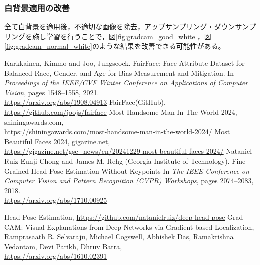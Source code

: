 \documentclass[a4paper,11pt,titlepage]{jsarticle}
\begin{document}
\subsubsection*{白背景適用の改善}
全て白背景を適用後，不適切な画像を除去，アップサンプリング・ダウンサンプリングを施し学習を行うことで，図\ref{fig:gradcam_good_white}，図\ref{fig:gradcam_normal_white}のような結果を改善できる可能性がある。




\begin{thebibliography}{9}
    Karkkainen, Kimmo and Joo, Jungseock.
    FairFace: Face Attribute Dataset for Balanced Race, Gender, and Age for Bias Measurement and Mitigation.
    In \textit{Proceedings of the IEEE/CVF Winter Conference on Applications of Computer Vision}, pages 1548--1558, 2021.\\
        \url{https://arxiv.org/abs/1908.04913}
      FairFace(GitHub), \url{https://github.com/joojs/fairface}
    Most Handsome Man In The World 2024, shiningawards.com, \\
    \url{https://shiningawards.com/most-handsome-man-in-the-world-2024/}
    Most Beautiful Faces 2024, gigazine.net, \\ \url{https://gigazine.net/gsc_news/en/20241229-most-beautiful-faces-2024/}
        Nataniel Ruiz Eunji Chong and James M. Rehg (Georgia Institute of Technology).
        Fine-Grained Head Pose Estimation Without Keypoints
         In \textit{The IEEE Conference on Computer Vision and Pattern Recognition (CVPR) Workshops}, pages 2074--2083, 2018. \\
          \url{https://arxiv.org/abs/1710.00925}

    Head Pose Estimation, \url{https://github.com/natanielruiz/deep-head-pose}
    Grad-CAM: Visual Explanations from Deep Networks via Gradient-based Localization, 
    Ramprasaath R. Selvaraju, Michael Cogswell, Abhishek Das, Ramakrishna Vedantam, Devi Parikh, Dhruv Batra,\\
    \url{https://arxiv.org/abs/1610.02391}
    
\end{thebibliography}


\end{document}
